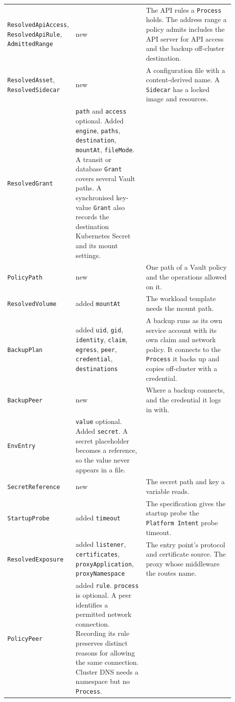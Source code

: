 \begin{longtable}{>{\raggedright\arraybackslash}p{0.22\linewidth}>{\raggedright\arraybackslash}p{0.31\linewidth}>{\raggedright\arraybackslash}p{0.39\linewidth}}
\texttt{ResolvedApiAccess}, \texttt{ResolvedApiRule}, \texttt{AdmittedRange} & new & The API rules a \texttt{Process} holds. The address range a policy admits includes the API server for API access and the backup off-cluster destination. \\
\texttt{ResolvedAsset}, \texttt{ResolvedSidecar} & new & A configuration file with a content-derived name. A \texttt{Sidecar} has a locked image and resources. \\
\texttt{ResolvedGrant} & \texttt{path} and \texttt{access} optional. Added \texttt{engine}, \texttt{paths}, \texttt{destination}, \texttt{mountAt}, \texttt{fileMode}. A transit or database \texttt{Grant} covers several Vault paths. A synchronised key-value \texttt{Grant} also records the destination Kubernetes Secret and its mount settings. \\
\texttt{PolicyPath} & new & One path of a Vault policy and the operations allowed on it. \\
\texttt{ResolvedVolume} & added \texttt{mountAt} & The workload template needs the mount path. \\
\texttt{BackupPlan} & added \texttt{uid}, \texttt{gid}, \texttt{identity}, \texttt{claim}, \texttt{egress}, \texttt{peer}, \texttt{credential}, \texttt{destinations} & A backup runs as its own service account with its own claim and network policy. It connects to the \texttt{Process} it backs up and copies off-cluster with a credential. \\
\texttt{BackupPeer} & new & Where a backup connects, and the credential it logs in with. \\
\texttt{EnvEntry} & \texttt{value} optional. Added \texttt{secret}. A secret placeholder becomes a reference, so the value never appears in a file. \\
\texttt{SecretReference} & new & The secret path and key a variable reads. \\
\texttt{StartupProbe} & added \texttt{timeout} & The specification gives the startup probe the \texttt{Platform Intent} probe timeout. \\
\texttt{ResolvedExposure} & added \texttt{listener}, \texttt{certificates}, \texttt{proxyApplication}, \texttt{proxyNamespace} & The entry point's protocol and certificate source. The proxy whose middleware the routes name. \\
\texttt{PolicyPeer} & added \texttt{rule}. \texttt{process} is optional. A peer identifies a permitted network connection. Recording its rule preserves distinct reasons for allowing the same connection. Cluster DNS needs a namespace but no \texttt{Process}. \\
\end{longtable}

